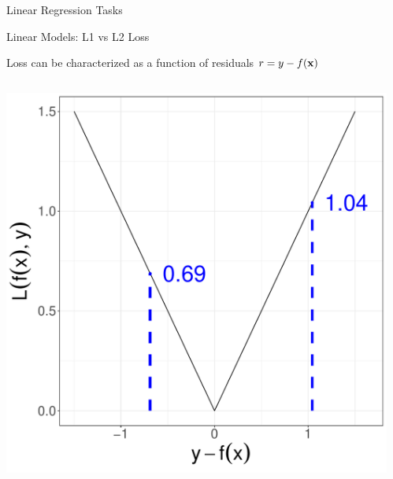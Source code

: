 \documentclass[11pt,compress,t,notes=noshow, xcolor=table]{beamer}
\begin{document}
\begin{vbframe}{Linear Regression Tasks}
\end{vbframe}



\begin{vbframe}{Linear Models: L1 vs L2 Loss}

\small Loss can be characterized as a function of residuals \textbf{$r = y - f(\mathbf{x})$}

\begin{columns}  
\begin{column}{0.4\textwidth} 
\begin{center}
  \includegraphics[width = \textwidth]{figure/nutshell-regression-L1.pdf}
\end{center}
\end{column}
\begin{column}{0.4\textwidth} 
\begin{center}

\end{center}
\end{column}
\end{columns}
\end{vbframe}
\end{document}
